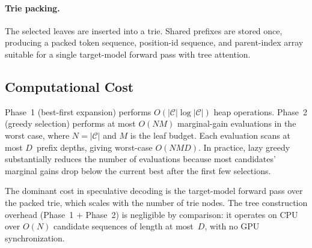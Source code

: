 \paragraph{Trie packing.}
The selected leaves are inserted into a trie.  Shared prefixes are
stored once, producing a packed token sequence, position-id sequence,
and parent-index array suitable for a single target-model forward pass
with tree attention.

\subsection{Computational Cost}
\label{sec:cost}

Phase~1 (best-first expansion) performs $O(|\mathcal{C}| \log |\mathcal{C}|)$
heap operations.  Phase~2 (greedy selection) performs at most $O(NM)$
marginal-gain evaluations in the worst case, where $N = |\mathcal{C}|$
and $M$ is the leaf budget.  Each evaluation scans at most $D$~prefix
depths, giving worst-case $O(NMD)$.  In practice, lazy greedy
substantially reduces the number of evaluations because most
candidates' marginal gains drop below the current best after the first
few selections.

The dominant cost in speculative decoding is the target-model forward
pass over the packed trie, which scales with the number of trie
nodes.  The tree construction overhead (Phase~1 + Phase~2) is
negligible by comparison: it operates on CPU over $O(N)$ candidate
sequences of length at most~$D$, with no GPU synchronization.

%

